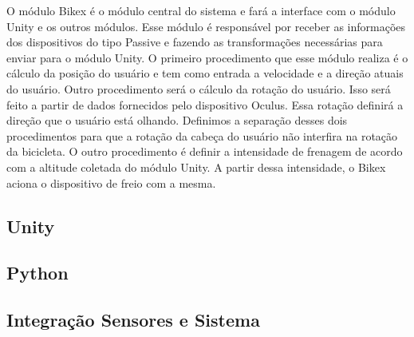 O módulo Bikex é o módulo central do sistema e fará a interface com o módulo Unity e os outros módulos. Esse módulo é responsável por receber as informações dos dispositivos do tipo Passive e fazendo as transformações necessárias para enviar para o módulo Unity. O primeiro procedimento que esse módulo realiza é o cálculo da posição do usuário e tem como entrada a velocidade e a direção atuais do usuário. Outro procedimento será o cálculo da rotação do usuário. Isso será feito a partir de dados fornecidos pelo dispositivo Oculus. Essa rotação definirá a direção que o usuário está olhando. Definimos a separação desses dois procedimentos para que a rotação da cabeça do usuário não interfira na rotação da bicicleta. O outro procedimento é definir a intensidade de frenagem de acordo com a altitude coletada do módulo Unity. A partir dessa intensidade, o Bikex aciona o dispositivo de freio com a mesma.



\subsection{Unity}

\subsection{Python}

\subsection{Integração Sensores e Sistema}
